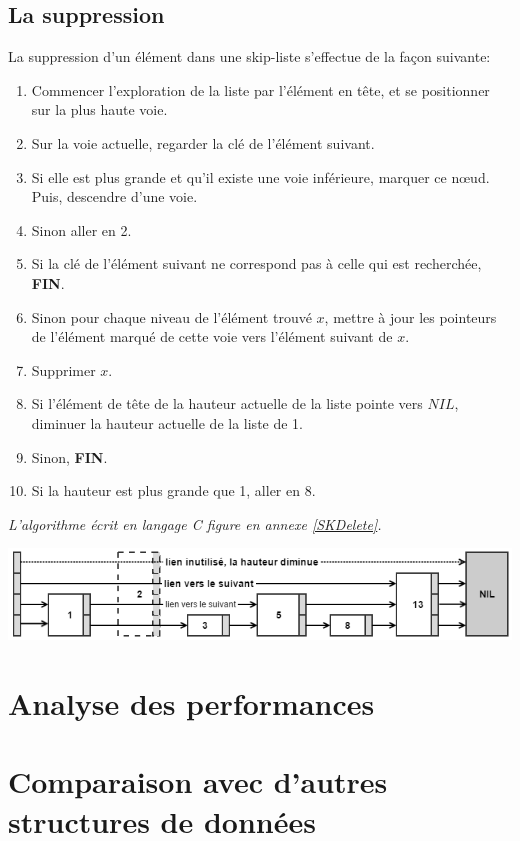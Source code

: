 \documentclass[hidelinks,a4paper, 12pt]{article}
\begin{document}
	\newpage
	\subsection{La suppression}
	La suppression d'un élément dans une skip-liste s'effectue de la façon suivante:
	\begin{enumerate}
		\item Commencer l'exploration de la liste par l'élément en tête, et se positionner sur la plus haute voie.
		\item Sur la voie actuelle, regarder la clé de l'élément suivant.
		\item Si elle est plus grande et qu'il existe une voie inférieure, marquer ce nœud. Puis, descendre d'une voie.
		\item Sinon aller en 2.
		\item Si la clé de l'élément suivant ne correspond pas à celle qui est recherchée, \textbf{FIN}.
		\item Sinon pour chaque niveau de l'élément trouvé $x$, mettre à jour les pointeurs de l'élément marqué de cette voie vers l'élément suivant de $x$.
		\item Supprimer $x$.
		\item Si l'élément de tête de la hauteur actuelle de la liste pointe vers $NIL$, diminuer la hauteur actuelle de la liste de 1.
		\item Sinon, \textbf{FIN}.
		\item Si la hauteur est plus grande que 1, aller en 8.
	\end{enumerate}
	\emph{L'algorithme écrit en langage C figure en annexe \ref{SKDelete}.}
	\begin{center}
		\includegraphics[width=\textwidth]{img/delete}
	\end{center}
	
	\section{Analyse des performances}\label{perf}
	\section{Comparaison avec d'autres structures de données}
	
\end{document}
